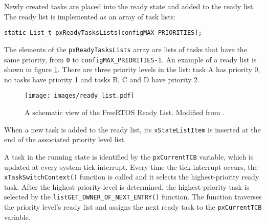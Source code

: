 Newly created tasks are placed into the ready state and added to the ready list. 
The ready list is implemented as an array of task lists:
\begin{lstlisting}[frame=none, label={lst:readylist}, caption={Ready task list}, captionpos=b]
static List_t pxReadyTasksLists[configMAX_PRIORITIES];
\end{lstlisting}
The elements of the \verb$pxReadyTasksLists$ array are lists of tasks that have the same priority, from \verb$0$ to \verb$configMAX_PRIORITIES-1$.
An example of a ready list is shown in figure \ref{freertos:ready}.
There are three priority levels in the list: task A has priority 0, no tasks have priority 1 and tasks B, C and D have priority 2. 

\begin{figure}[ht]
    \centering
    \texttt{[image: images/ready\_list.pdf]}
    \caption{A schematic view of the FreeRTOS Ready List. Modified from \cite{brown2012architecture}.}
    \label{freertos:ready}
\end{figure}
When a new task is added to the ready list, its \verb$xStateListItem$ is inserted at the end of the 
associated priority level list.

A task in the running state is identified by the \verb$pxCurrentTCB$ variable, which is updated at every system tick interrupt. 
Every time the tick interrupt occurs, the \verb$xTaskSwitchContext()$ function is called and it selects the highest-priority ready task.
After the highest priority level is determined,
the highest-priority task is selected by the \verb$listGET_OWNER_OF_NEXT_ENTRY()$ function.
The function traverses the priority level's ready list and assigns the next ready task to the \verb$pxCurrentTCB$ variable.

